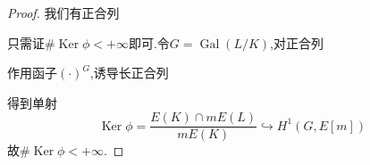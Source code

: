 \documentclass[12pt,A4paper,oneside,reqno]{amsart}
\numberwithin{equation}{section}
\theoremstyle{definition}
\theoremstyle{plain}
\theoremstyle{plain}
\numberwithin{equation}{section}
\theoremstyle{remark}
\DeclareMathOperator{\Ker}{\operatorname{Ker}}
\newcommand{\Hom}{\operatorname{Hom}}
\newcommand{\Gal}{\operatorname{Gal}}
\newcommand{\Set}{\operatorname{\textbf{Set}}}
\begin{document}
\begin{proof}
	我们有正合列
	\begin{center}
	\end{center}

只需证$\#\Ker \phi < + \infty$即可.令$G=\Gal(L/K)$,对正合列
	\begin{center}
	\end{center}
作用函子$(\cdot)^G$,诱导长正合列
	\begin{center}
	\end{center}
得到单射
$$\Ker \phi=\frac{E(K) \cap mE(L)}{mE(K)} \hookrightarrow H^1(G,E[m])$$
故$\#\Ker \phi < + \infty$.
\iffalse%
对每一个$\bar{P} \in \Ker \phi$(后省略代表元符号),设$P=nQ$, $Q \in E(L)$,我们指定一个良定映射(与$Q$相关)
$$\lambda_P: \Gal (L/K) \longrightarrow E[m] \qquad \sigma \longmapsto \sigma(Q)-Q$$
于是我们得到一个非自然的映射:
$$\Phi \longrightarrow \Hom_{\Set}(\Gal (L/K), E[m]) \qquad P \longmapsto \lambda_P$$
可以验证$\Phi$为单射:
\begin{equation*}
\begin{aligned}
\Phi(P)=\Phi(P') \Longrightarrow&\; \sigma(Q)-Q=\sigma(Q')-Q' \quad\text{ for any } \sigma \in \Gal(L/K)\\
\Longrightarrow&\;\sigma(Q-Q')=Q-Q'\quad\text{ for any } \sigma \in \Gal(L/K)\\
\Longrightarrow&\;Q-Q' \in E(K)\\
\Longrightarrow&\;P-P'=m(Q-Q')=0 \quad{ in } \;\Ker \phi\\
\end{aligned}
\end{equation*}
故$\#\Ker \phi < + \infty$.
\fi%
\end{proof}
\end{document}
